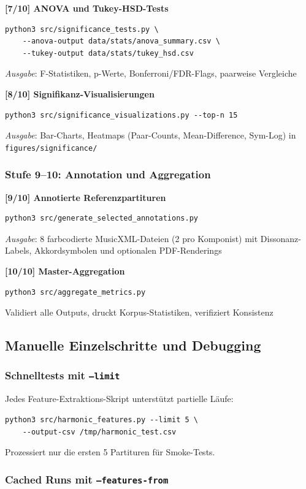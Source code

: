 \documentclass[12pt,a4paper]{article}
\theoremstyle{definition}
\begin{document}
\textbf{[7/10] ANOVA und Tukey-HSD-Tests}
\begin{lstlisting}
python3 src/significance_tests.py \
    --anova-output data/stats/anova_summary.csv \
    --tukey-output data/stats/tukey_hsd.csv
\end{lstlisting}
\textit{Ausgabe}: F-Statistiken, p-Werte, Bonferroni/FDR-Flags, paarweise Vergleiche

\textbf{[8/10] Signifikanz-Visualisierungen}
\begin{lstlisting}
python3 src/significance_visualizations.py --top-n 15
\end{lstlisting}
\textit{Ausgabe}: Bar-Charts, Heatmaps (Paar-Counts, Mean-Difference, Sym-Log) in \texttt{figures/significance/}

\subsubsection{Stufe 9--10: Annotation und Aggregation}

\textbf{[9/10] Annotierte Referenzpartituren}
\begin{lstlisting}
python3 src/generate_selected_annotations.py
\end{lstlisting}
\textit{Ausgabe}: 8 farbcodierte MusicXML-Dateien (2 pro Komponist) mit Dissonanz-Labels, Akkordsymbolen und optionalen PDF-Renderings

\textbf{[10/10] Master-Aggregation}
\begin{lstlisting}
python3 src/aggregate_metrics.py
\end{lstlisting}
Validiert alle Outputs, druckt Korpus-Statistiken, verifiziert Konsistenz

\subsection{Manuelle Einzelschritte und Debugging}

\subsubsection{Schnelltests mit \texttt{--limit}}

Jedes Feature-Extraktions-Skript unterstützt partielle Läufe:
\begin{lstlisting}
python3 src/harmonic_features.py --limit 5 \
    --output-csv /tmp/harmonic_test.csv
\end{lstlisting}
Prozessiert nur die ersten 5 Partituren für Smoke-Tests.

\subsubsection{Cached Runs mit \texttt{--features-from}}
\end{document}
